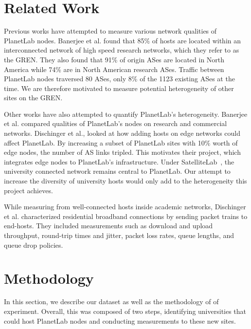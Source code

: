 \documentclass{sig-alternate-10pt}
\begin{document}
\section{Related Work} 


Previous works have attempted to measure various network qualities of PlanetLab
nodes. Banerjee et al.\cite{banerjee:connectivity} found that 85\% of hosts are
located within an interconnected network of high speed research networks, which they 
refer to as the GREN. They also found that 91\% of origin ASes are located in North 
America while 74\% are in North American research ASes. Traffic between PlanetLab nodes
traversed 80 ASes, only 8\% of the 1123 existing ASes at the time. We are therefore
motivated to measure potential heterogeneity of other sites on the GREN.

Other works have also attempted to quantify PlanetLab’s heterogeneity. Banerjee et al.
\cite{banerjee:connectivity} compared qualities of PlanetLab’s nodes on research and 
commercial networks. Dischinger et al.\cite{dischinger:satellitelab}, looked 
at how adding hosts on edge networks could affect PlanetLab. By increasing a subset of 
PlanetLab sites with 10\% worth of edge nodes, the number of AS links tripled. This 
motivates their project, which integrates edge nodes to PlanetLab’s infrastructure. Under
SatelliteLab~\cite{dischinger:satellitelab}, the university connected network
remains central to PlanetLab.  Our attempt to increase the diversity of
university hosts would only add to the heterogeneity this project achieves.

While measuring from well-connected hosts inside academic networks, Dischinger
et al.\cite{dischinger:residential} characterized residential broadband
connections by sending packet trains to end-hosts. They included measurements
such as download and upload throughput, round-trip times and jitter, packet
loss rates, queue lengths, and queue drop policies. 



\section{Methodology}

In this section, we describe our dataset as well as the methodology of of
experiment.  Overall, this was composed of two steps, identifying universities
that could host PlanetLab nodes and conducting measurements to these new sites.
\end{document}
